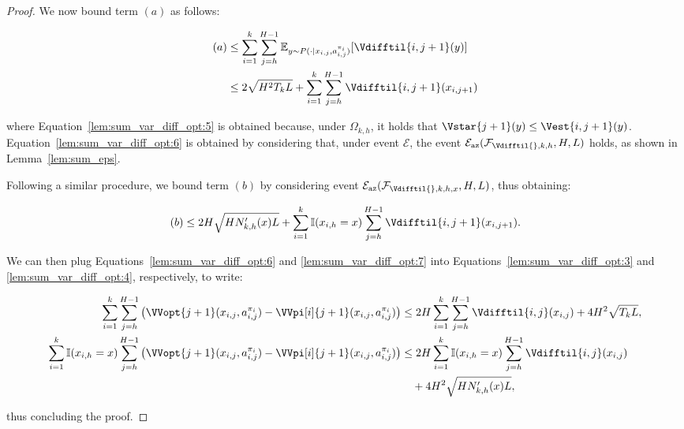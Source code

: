 \begin{proof}
We now bound term $(a)$ as follows:

\begin{align}
    (a) &\le \sum_{i=1}^k \sum_{j=h}^{H-1} \mathbb{E}_{y \sim P(\cdot | x_{i,j}, a_{i,j}^{\pi_i})} [\Vdifftil{i, j+1}(y)] \label{lem:sum_var_diff_opt:5} \\
    &\le 2 \sqrt{H^2 T_k L} + \sum_{i=1}^k \sum_{j=h}^{H-1} \Vdifftil{i,j+1}(x_{i,j+1}) \label{lem:sum_var_diff_opt:6}
\end{align}

where Equation~\eqref{lem:sum_var_diff_opt:5} is obtained because, under $\Omega_{k,h}$, it holds that ${\Vstar{j+1}(y) \le \Vest{i,j+1}(y)}$. Equation~\eqref{lem:sum_var_diff_opt:6} is obtained by considering that, under event $\mathcal{E}$, the event $\mathcal{E}_{\mathrm{az}} (\mathcal{F}_{\Vdifftil{}, k, h}, H, L)$ holds, as shown in Lemma~\ref{lem:sum_eps}.

Following a similar procedure, we bound term $(b)$ by considering event $\mathcal{E}_{\mathrm{az}}(\mathcal{F}_{\Vdifftil{}, k, h, x}, H, L)$, thus obtaining:

\begin{equation}
\label{lem:sum_var_diff_opt:7}
    (b) \le 2H \sqrt{H N'_{k,h}(x) L} + \sum_{i=1}^k \mathbb{I}(x_{i,h}=x) \sum_{j=h}^{H-1} \Vdifftil{i,j+1}(x_{i,j+1}).
\end{equation}

We can then plug Equations~\eqref{lem:sum_var_diff_opt:6} and \eqref{lem:sum_var_diff_opt:7} into Equations~\eqref{lem:sum_var_diff_opt:3} and \eqref{lem:sum_var_diff_opt:4}, respectively, to write:

\begin{align*}
    \sum_{i=1}^k \sum_{j=h}^{H-1} \left( \VVopt{j+1} (x_{i,j}, a_{i,j}^{\pi_i}) - \VVpi[i]{j+1} (x_{i,j}, a_{i,j}^{\pi_i}) \right) &\le 2 H \sum_{i=1}^k \sum_{j=h}^{H-1} \Vdifftil{i,j}(x_{i,j}) + 4 H^2 \sqrt{T_k L}, \\
    \sum_{i=1}^k \mathbb{I}(x_{i,h}=x) \sum_{j=h}^{H-1} \left( \VVopt{j+1} (x_{i,j}, a_{i,j}^{\pi_i}) - \VVpi[i]{j+1} (x_{i,j}, a_{i,j}^{\pi_i}) \right) &\le 2 H \sum_{i=1}^k \mathbb{I}(x_{i,h}=x) \sum_{j=h}^{H-1} \Vdifftil{i,j}(x_{i,j}) \\
    &\quad + 4H^2 \sqrt{H N'_{k,h}(x) L},
\end{align*}

thus concluding the proof.
\end{proof}


